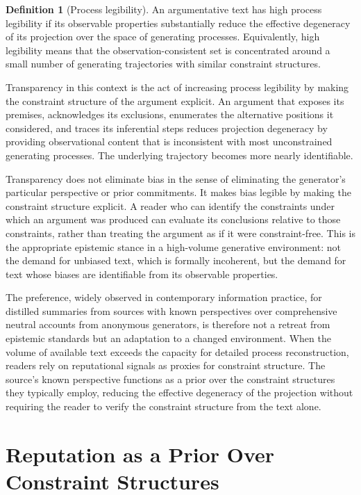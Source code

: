 \documentclass[12pt, oneside]{article}
\theoremstyle{plain}
\theoremstyle{definition}
\newtheorem{definition}[theorem]{Definition}
\theoremstyle{remark}
\begin{document}
\begin{definition}[Process legibility]
An argumentative text has high process legibility if its observable properties substantially
reduce the effective degeneracy of its projection over the space of generating processes.
Equivalently, high legibility means that the observation-consistent set is concentrated
around a small number of generating trajectories with similar constraint structures.
\end{definition}

Transparency in this context is the act of increasing process legibility by making the
constraint structure of the argument explicit. An argument that exposes its premises,
acknowledges its exclusions, enumerates the alternative positions it considered, and traces
its inferential steps reduces projection degeneracy by providing observational content that
is inconsistent with most unconstrained generating processes. The underlying trajectory
becomes more nearly identifiable.

Transparency does not eliminate bias in the sense of eliminating the generator's particular
perspective or prior commitments. It makes bias legible by making the constraint structure
explicit. A reader who can identify the constraints under which an argument was produced
can evaluate its conclusions relative to those constraints, rather than treating the argument
as if it were constraint-free. This is the appropriate epistemic stance in a high-volume
generative environment: not the demand for unbiased text, which is formally incoherent, but
the demand for text whose biases are identifiable from its observable properties.

The preference, widely observed in contemporary information practice, for distilled summaries
from sources with known perspectives over comprehensive neutral accounts from anonymous
generators, is therefore not a retreat from epistemic standards but an adaptation to a
changed environment. When the volume of available text exceeds the capacity for detailed
process reconstruction, readers rely on reputational signals as proxies for constraint
structure. The source's known perspective functions as a prior over the constraint structures
they typically employ, reducing the effective degeneracy of the projection without requiring
the reader to verify the constraint structure from the text alone.

\section{Reputation as a Prior Over Constraint Structures}
\end{document}
